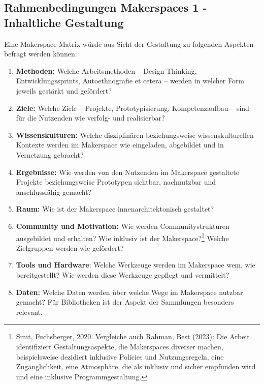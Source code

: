 \documentclass[a4paper,
fontsize=11pt,
oneside,
numbers=noperiodatend,
parskip=half-,
bibliography=totoc,
final
]{scrartcl}
\begin{document}
\hypertarget{rahmenbedingungen-makerspaces-1---inhaltliche-gestaltung}{%
\subsection{Rahmenbedingungen Makerspaces 1 - Inhaltliche
Gestaltung}\label{rahmenbedingungen-makerspaces-1---inhaltliche-gestaltung}}

Eine Makerspace-Matrix würde aus Sicht der Gestaltung zu folgenden
Aspekten befragt werden können:

\begin{enumerate}
\def\labelenumi{\arabic{enumi}.}
\item
  \textbf{Methoden:} Welche Arbeitsmethoden -- Design Thinking,
  Entwicklungssprints, Autoethnografie et cetera -- werden in welcher
  Form jeweils gestärkt und gefördert?
\item
  \textbf{Ziele:} Welche Ziele -- Projekte, Prototypisierung,
  Kompetenzaufbau -- sind für die Nutzenden wie verfolg- und
  realisierbar?
\item
  \textbf{Wissenskulturen:} Welche disziplinären beziehungsweise
  wissenskulturellen Kontexte werden im Makerspace wie eingeladen,
  abgebildet und in Vernetzung gebracht?
\item
  \textbf{Ergebnisse:} Wie werden von den Nutzenden im Makerspace
  gestaltete Projekte beziehungsweise Prototypen sichtbar, nachnutzbar
  und anschlussfähig gemacht?
\item
  \textbf{Raum:} Wie ist der Makerspace innenarchitektonisch gestaltet?
\item
  \textbf{Community und Motivation:} Wie werden Communitystrukturen
  ausgebildet und erhalten? Wie inklusiv ist der Makerspace?\footnote{Smit,
    Fuchsberger, 2020. Vergleiche auch Rahman, Best (2023): Die Arbeit
    identifiziert Gestaltungsaspekte, die Makerspaces diverser machen,
    beispielsweise dezidiert inklusive Policies und Nutzungsregeln, eine
    Zugänglichkeit, eine Atmosphäre, die als inklusiv und sicher
    empfunden wird und eine inklusive Programmgestaltung.} Welche
  Zielgruppen werden wie gefördert?
\item
  \textbf{Tools und Hardware}: Welche Werkzeuge werden im Makerspace
  wem, wie bereitgestellt? Wie werden diese Werkzeuge gepflegt und
  vermittelt?
\item
  \textbf{Daten:} Welche Daten werden über welche Wege im Makerspace
  nutzbar gemacht? Für Bibliotheken ist der Aspekt der Sammlungen
  besonders relevant.
\end{enumerate}
\end{document}
